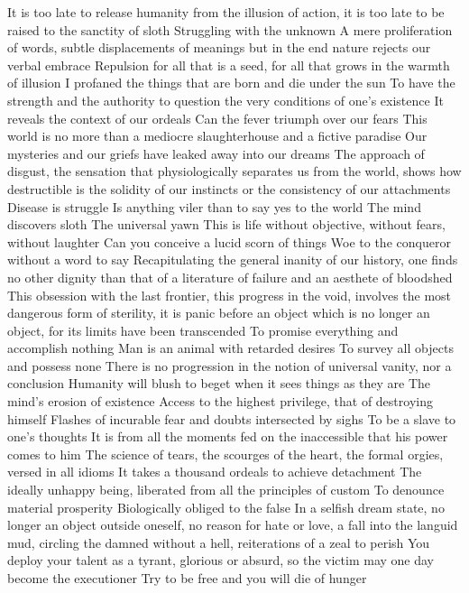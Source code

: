 \documentclass{article}
\begin{document}
It is too late to release humanity from the illusion of action, it is too late to be raised to the sanctity of sloth
Struggling with the unknown
A mere proliferation of words, subtle displacements of meanings but in the end nature rejects our verbal embrace
Repulsion for all that is a seed, for all that grows in the warmth of illusion
I profaned the things that are born and die under the sun
To have the strength and the authority to question the very conditions of one's existence
It reveals the context of our ordeals
Can the fever triumph over our fears
This world is no more than a mediocre slaughterhouse and a fictive paradise
Our mysteries and our griefs have leaked away into our dreams
The approach of disgust, the sensation that physiologically separates us from the world, shows how destructible is the solidity of our instincts or the consistency of our attachments
Disease is struggle
Is anything viler than to say yes to the world
The mind discovers sloth
The universal yawn
This is life without objective, without fears, without laughter
Can you conceive a lucid scorn of things
Woe to the conqueror without a word to say
Recapitulating the general inanity of our history, one finds no other dignity than that of a literature of failure and an aesthete of bloodshed
This obsession with the last frontier, this progress in the void, involves the most dangerous form of sterility, it is panic before an object which is no longer an object, for its limits have been transcended
To promise everything and accomplish nothing
Man is an animal with retarded desires
To survey all objects and possess none
There is no progression in the notion of universal vanity, nor a conclusion
Humanity will blush to beget when it sees things as they are
The mind's erosion of existence
Access to the highest privilege, that of destroying himself
Flashes of incurable fear and doubts intersected by sighs
To be a slave to one's thoughts
It is from all the moments fed on the inaccessible that his power comes to him
The science of tears, the scourges of the heart, the formal orgies, versed in all idioms
It takes a thousand ordeals to achieve detachment
The ideally unhappy being, liberated from all the principles of custom
To denounce material prosperity
Biologically obliged to the false
In a selfish dream state, no longer an object outside oneself, no reason for hate or love, a fall into the languid mud, circling the damned without a hell, reiterations of a zeal to perish
You deploy your talent as a tyrant, glorious or absurd, so the victim may one day become the executioner
Try to be free and you will die of hunger
\end{document}
